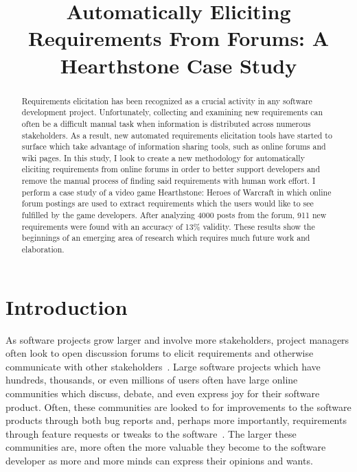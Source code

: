 \documentclass[conference]{IEEEtran}
\begin{document}
\title{Automatically Eliciting Requirements From Forums: A Hearthstone Case Study}

\author{
}

\maketitle


\begin{abstract}
Requirements elicitation has been recognized as a crucial activity in any software development project. 
Unfortunately, collecting and examining new requirements can often be a difficult manual task when
information is distributed across numerous stakeholders. As a result, new automated requirements elicitation tools
have started to surface which take advantage of information sharing tools, such as online forums and wiki pages.
In this study, I look to create a new methodology for automatically eliciting requirements from online forums in
order to better support developers and remove the manual process of finding said requirements with human work effort.
I perform a case study of a video game Hearthstone: Heroes of Warcraft in which online forum postings are used to
extract requirements which the users would like to see fulfilled by the game developers. After analyzing 4000 posts 
from the forum, 911 new requirements were found with an accuracy of 13\% validity. These results show the beginnings
of an emerging area of research which requires much future work and elaboration.
\end{abstract}


\section{Introduction}

As software projects grow larger and involve more
stakeholders, project managers often look to open discussion forums to elicit requirements
and otherwise communicate with other stakeholders~\cite{Wanner:2011:FEU}.
Large software projects which have hundreds, thousands, or even millions of users
often have large online communities which discuss, debate, and even express joy
for their software product. Often, these communities are looked to for improvements
to the software products through both bug reports and, perhaps more importantly, requirements
through feature requests or tweaks to the software~\cite{Shin}. The larger these communities are, more
often the more valuable they become to the software developer as more and more minds can express
their opinions and wants.
\end{document}
